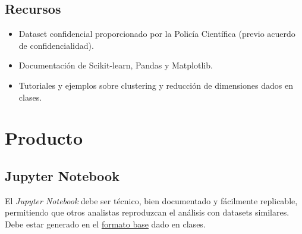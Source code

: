 \documentclass[a4,11pt]{aleph-notas}
\begin{document}
\subsection*{Recursos}
\begin{itemize}[leftmargin=*]
\item Dataset confidencial proporcionado por la Policía Científica (previo acuerdo de confidencialidad).
\item Documentación de Scikit-learn, Pandas y Matplotlib.
\item Tutoriales y ejemplos sobre clustering y reducción de dimensiones dados en clases.
\end{itemize}

\section*{Producto}

\subsection{Jupyter Notebook}
El \textit{Jupyter Notebook} debe ser técnico, bien documentado y fácilmente replicable, permitiendo que otros analistas reproduzcan el análisis con datasets similares. Debe estar generado en el \href{https://github.com/andres-merino/FormatoBaseProyectos/blob/main/Plantilla.ipynb}{formato base} dado en clases.
\end{document}
